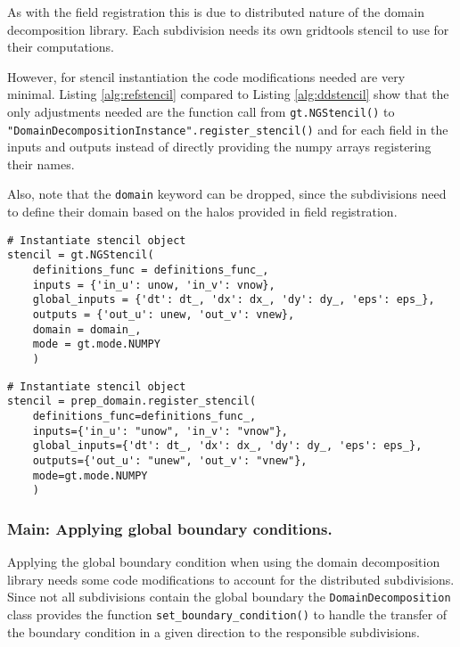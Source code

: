 As with the field registration this is due to distributed nature of the domain decomposition library.
Each subdivision needs its own gridtools stencil to use for their computations.

However, for stencil instantiation the code modifications needed are very minimal.
Listing \ref{alg:refstencil} compared to Listing \ref{alg:ddstencil} show that the only adjustments needed are the function call from \texttt{gt.NGStencil()} to \texttt{"DomainDecompositionInstance".register\_stencil()} and for each field in the inputs and outputs instead of directly providing the numpy arrays registering their names.

Also, note that the \texttt{domain} keyword can be dropped, since the subdivisions need to define their domain based on the halos provided in field registration.

\begin{lstlisting}[caption={Example code for the original user stencil instantiation.},captionpos=b, label={alg:refstencil}, float, floatplacement=H]
# Instantiate stencil object
stencil = gt.NGStencil(
    definitions_func = definitions_func_,
    inputs = {'in_u': unow, 'in_v': vnow},
    global_inputs = {'dt': dt_, 'dx': dx_, 'dy': dy_, 'eps': eps_},
    outputs = {'out_u': unew, 'out_v': vnew},
    domain = domain_,
    mode = gt.mode.NUMPY
    )
\end{lstlisting}

\begin{lstlisting}[caption={Example code for the same stencil instantiation using the domain decomposition library.},captionpos=b, label={alg:ddstencil}, float, floatplacement=H]
# Instantiate stencil object
stencil = prep_domain.register_stencil(
    definitions_func=definitions_func_,
    inputs={'in_u': "unow", 'in_v': "vnow"},
    global_inputs={'dt': dt_, 'dx': dx_, 'dy': dy_, 'eps': eps_},
    outputs={'out_u': "unew", 'out_v': "vnew"},
    mode=gt.mode.NUMPY
    )
\end{lstlisting}

\subsubsection{Main: Applying global boundary conditions.}
Applying the global boundary condition when using the domain decomposition library needs some code modifications to account for the distributed subdivisions.
Since not all subdivisions contain the global boundary the \texttt{DomainDecomposition} class provides the function \texttt{set\_boundary\_condition()} to handle the transfer of the boundary condition in a given direction to the responsible subdivisions.

